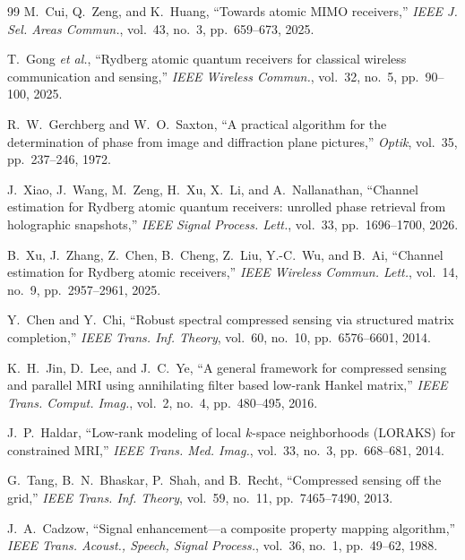 \documentclass[journal]{IEEEtran}
\begin{document}
\enlargethispage{3\baselineskip}
\begin{thebibliography}{99}
 M.~Cui, Q.~Zeng, and K.~Huang, ``Towards atomic MIMO
receivers,'' \emph{IEEE J. Sel. Areas Commun.}, vol.~43, no.~3, pp.~659--673,
2025.

 T.~Gong \emph{et al.}, ``Rydberg atomic quantum receivers
for classical wireless communication and sensing,'' \emph{IEEE Wireless
Commun.}, vol.~32, no.~5, pp.~90--100, 2025.

 R.~W.~Gerchberg and W.~O.~Saxton, ``A practical
algorithm for the determination of phase from image and diffraction plane
pictures,'' \emph{Optik}, vol.~35, pp.~237--246, 1972.

 J.~Xiao, J.~Wang, M.~Zeng, H.~Xu, X.~Li, and
A.~Nallanathan, ``Channel estimation for Rydberg atomic quantum receivers:
unrolled phase retrieval from holographic snapshots,'' \emph{IEEE Signal
Process. Lett.}, vol.~33, pp.~1696--1700, 2026.

 B.~Xu, J.~Zhang, Z.~Chen, B.~Cheng, Z.~Liu, Y.-C.~Wu, and
B.~Ai, ``Channel estimation for Rydberg atomic receivers,'' \emph{IEEE Wireless
Commun. Lett.}, vol.~14, no.~9, pp.~2957--2961, 2025.

 Y.~Chen and Y.~Chi, ``Robust spectral compressed sensing
via structured matrix completion,'' \emph{IEEE Trans. Inf. Theory}, vol.~60,
no.~10, pp.~6576--6601, 2014.

 K.~H.~Jin, D.~Lee, and J.~C.~Ye, ``A general framework
for compressed sensing and parallel MRI using annihilating filter based
low-rank Hankel matrix,'' \emph{IEEE Trans. Comput. Imag.}, vol.~2, no.~4,
pp.~480--495, 2016.

 J.~P.~Haldar, ``Low-rank modeling of local
$k$-space neighborhoods (LORAKS) for constrained MRI,'' \emph{IEEE Trans. Med.
Imag.}, vol.~33, no.~3, pp.~668--681, 2014.

 G.~Tang, B.~N.~Bhaskar, P.~Shah, and B.~Recht,
``Compressed sensing off the grid,'' \emph{IEEE Trans. Inf. Theory}, vol.~59,
no.~11, pp.~7465--7490, 2013.

 J.~A.~Cadzow, ``Signal enhancement---a composite property
mapping algorithm,'' \emph{IEEE Trans. Acoust., Speech, Signal Process.},
vol.~36, no.~1, pp.~49--62, 1988.


\end{thebibliography}
\end{document}

